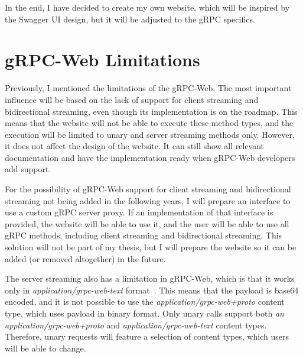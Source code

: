 In the end, I have decided to create my own website, which will be inspired by the Swagger UI design, but it will be adjusted to the gRPC specifics.


\section{gRPC-Web Limitations}
Previously, I mentioned the limitations of the gRPC-Web.
The most important influence will be based on the lack of support for client streaming and bidirectional streaming, even though its implementation is on the roadmap.
This means that the website will not be able to execute these method types, and the execution will be limited to unary and server streaming methods only.
However, it does not affect the design of the website.
It can still show all relevant documentation and have the implementation ready when gRPC-Web developers add support.

For the possibility of gRPC-Web support for client streaming and bidirectional streaming not being added in the following years, I will prepare an interface to use a custom gRPC server proxy.
If an implementation of that interface is provided, the website will be able to use it, and the user will be able to use all gRPC methods, including client streaming and bidirectional streaming.
This solution will not be part of my thesis, but I will prepare the website so it can be added (or removed altogether) in the future.


The server streaming also has a limitation in gRPC-Web, which is that it works only in \textit{application/grpc-web-text} format~\cite{grpc-web}.
This means that the payload is base64 encoded, and it is not possible to use the \textit{application/grpc-web+proto} content type, which uses payload in binary format.
Only unary calls support both \textit{an application/grpc-web+proto} and \textit{application/grpc-web-text} content types.
Therefore, unary requests will feature a selection of content types, which users will be able to change.


